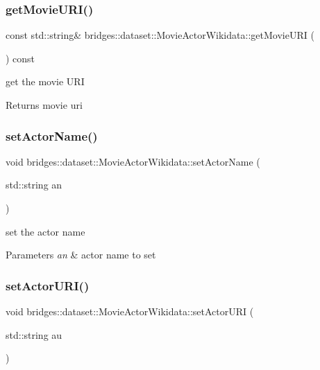 \subsubsection{\texorpdfstring{get\+Movie\+U\+R\+I()}{getMovieURI()}}
{\footnotesize\ttfamily const std\+::string\& bridges\+::dataset\+::\+Movie\+Actor\+Wikidata\+::get\+Movie\+U\+RI (\begin{DoxyParamCaption}{ }\end{DoxyParamCaption}) const\hspace{0.3cm}{\ttfamily [inline]}}

get the movie U\+RI \begin{DoxyReturn}{Returns}
movie uri 
\end{DoxyReturn}
\mbox{\label{classbridges_1_1dataset_1_1_movie_actor_wikidata_a4d3f6d1c293fb778958b0dbe7e841984}} 
\subsubsection{\texorpdfstring{set\+Actor\+Name()}{setActorName()}}
{\footnotesize\ttfamily void bridges\+::dataset\+::\+Movie\+Actor\+Wikidata\+::set\+Actor\+Name (\begin{DoxyParamCaption}\item[{std\+::string}]{an }\end{DoxyParamCaption})\hspace{0.3cm}{\ttfamily [inline]}}

set the actor name 
\begin{DoxyParams}{Parameters}
{\em an} & actor name to set \\
\hline
\end{DoxyParams}
\mbox{\label{classbridges_1_1dataset_1_1_movie_actor_wikidata_aafc78c4df66a895757d8e4edff583d0e}} 
\subsubsection{\texorpdfstring{set\+Actor\+U\+R\+I()}{setActorURI()}}
{\footnotesize\ttfamily void bridges\+::dataset\+::\+Movie\+Actor\+Wikidata\+::set\+Actor\+U\+RI (\begin{DoxyParamCaption}\item[{std\+::string}]{au }\end{DoxyParamCaption})\hspace{0.3cm}{\ttfamily [inline]}}

